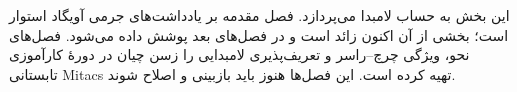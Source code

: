 \documentclass[../../include/open-logic-part]{subfiles}
\begin{document}

\begin{editorial}
این بخش به حساب لامبدا می‌پردازد. فصل مقدمه بر یادداشت‌های جرمی آویگاد
استوار است؛ بخشی از آن اکنون زائد است و در فصل‌های بعد پوشش داده می‌شود.
فصل‌های نحو، ویژگی چرچ--راسر و تعریف‌پذیری لامبدایی را زسن چیان در
دورهٔ کارآموزی تابستانی Mitacs تهیه کرده است. این فصل‌ها هنوز باید
بازبینی و اصلاح شوند.
\end{editorial}





\OLEndPartHook
\end{document}
